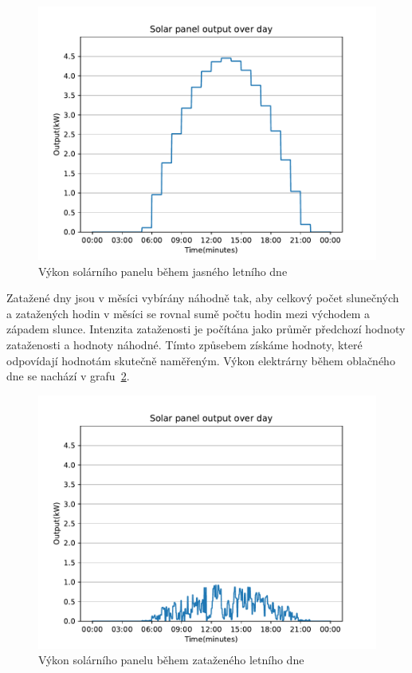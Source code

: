 \documentclass[12pt,a4paper]{article}
\begin{document}
\begin{figure}
\includegraphics[width=\linewidth]{img/solar_day_clear.pdf}
\caption{Výkon solárního panelu během jasného letního dne}
\label{fig:solar_day_clear}
\end{figure}

Zatažené dny jsou v měsíci vybírány náhodně tak, aby celkový počet slunečných a zatažených hodin v měsíci se rovnal sumě počtu hodin mezi východem a západem slunce. Intenzita zataženosti je počítána jako průměr předchozí hodnoty zataženosti a hodnoty náhodné. Tímto způsebem získáme hodnoty, které odpovídají hodnotám skutečně naměřeným. Výkon elektrárny během oblačného dne se nachází v grafu~\ref{fig:solar_day_cloudy}. \cite{zilvar-2022}

\begin{figure}
\includegraphics[width=\linewidth]{img/solar_day_cloudy.pdf}
\caption{Výkon solárního panelu během zataženého letního dne}
\label{fig:solar_day_cloudy}
\end{figure}
\end{document}
